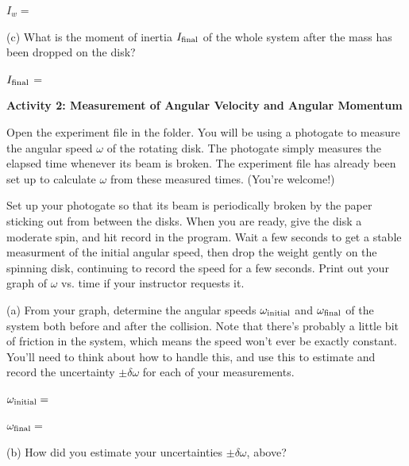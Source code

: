 \medskip
\hspace{0.5in} $I_w =$
\answerspace{0.6in}
\pagebreak[3]


(c) What is the moment of inertia $I_{\rm final}$ of the whole system after the mass has been dropped on the disk?

\medskip

\hspace{0.5in} $I_{\rm final}$ = 
\answerspace{0.4in}

\bigskip
\textbf{Activity 2: Measurement of Angular Velocity and Angular Momentum}

Open the experiment file  in the \filename{\coursefolder} folder.  
You will be using a photogate to measure the angular speed $\omega$ of the rotating disk.  The photogate simply measures the elapsed time whenever its beam is broken.  The experiment file has already been set up to calculate $\omega$ from these measured times.  (You're welcome!)

Set up your photogate so that its beam is periodically broken by the paper sticking out from between the disks.  When you are ready, give the disk a moderate spin, and hit record in the program.  Wait a few seconds to get a stable measurment of the initial angular speed, then drop the weight gently on the spinning disk, continuing to record the speed for a few seconds.  Print out your graph of $\omega$ vs. time if your instructor requests it.

(a) From your graph, determine the angular speeds $\omega_{\rm initial}$ and $\omega_{\rm final}$ of the system both before and after the collision.  Note that there's probably a little bit of friction in the system, which means the speed won't ever be exactly constant.  You'll need to think about how to handle this, and use this to estimate and record the uncertainty $\pm \delta \omega$ for each of your measurements.

\medskip
\hspace{0.5in} $\omega_{\rm initial} =$

\bigskip
\hspace{0.5in} $\omega_{\rm final} =$
\answerspace{0.3in}

(b) How did you estimate your uncertainties $\pm \delta \omega$, above?
\answerspace{1 in}


